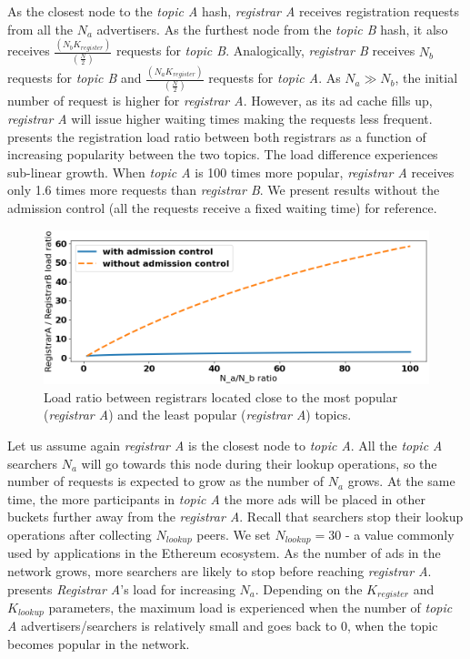 As the closest node to the \emph{topic A} hash, \emph{registrar A} receives registration requests from all the $N_a$ advertisers. As the furthest node from the \emph{topic B} hash, it also receives $\frac{(N_{b}K_\textit{register})}{(\frac{N}{2})}$ requests for \emph{topic B}. Analogically, \emph{registrar B} receives $N_b$ requests for \emph{topic B} and $\frac{(N_{a}K_\textit{register})}{(\frac{N}{2})}$ requests for \emph{topic A}. As $N_a \gg N_b$, the initial number of request is higher for \emph{registrar A}. However, as its ad cache fills up, \emph{registrar A} will issue higher waiting times making the requests less frequent.  presents the registration load ratio between both registrars as a function of increasing popularity between the two topics. The load difference experiences sub-linear growth. When \emph{topic A} is 100 times more popular, \emph{registrar A} receives only 1.6 times more requests than \emph{registrar B}. We present results without the admission control (\ie all the requests receive a fixed waiting time) for reference. 

\begin{figure}[t]
    \includegraphics[width=1\linewidth]{img/fairness_registration}
    \caption{Load ratio between registrars located close to the most popular (\emph{registrar A}) and the least popular (\emph{registrar A}) topics.
    }
    \label{fig:fairness_registration}
\end{figure}

Let us assume again \emph{registrar A} is the closest node to \emph{topic A}. All the \emph{topic A} searchers $N_a$ will go towards this node during their lookup operations, so the number of requests is expected to grow as the number of $N_a$ grows. At the same time, the more participants in \emph{topic A} the more ads will be placed in other buckets further away from the \emph{registrar A}. Recall that searchers stop their lookup operations after collecting $N_{lookup}$ peers. We set $N_{lookup} = 30$ - a value commonly used by applications in the Ethereum ecosystem. As the number of ads in the network grows, more searchers are likely to stop before reaching \emph{registrar A}.  presents \emph{Registrar A}'s load for increasing $N_a$. Depending on the $K_{register}$ and $K_{lookup}$ parameters, the maximum load is experienced when the number of \emph{topic A} advertisers/searchers is relatively small and goes back to $0$, when the topic becomes popular in the network. 

